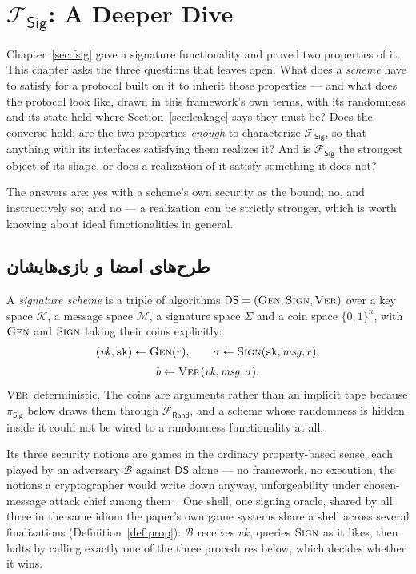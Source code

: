\documentclass[10pt,oneside,openany]{book}
\makeatletter
\newcommand{\nav@headtext}{}
\newcommand{\nav@setheadtext}[1]{%
  \gdef\nav@headtext{%
    \ifnum\c@secnumdepth>\m@ne
      \if@mainmatter \@chapapp\ \lr{\thechapter.}\ \fi
    \fi #1}}
\newcommand{\chapterhead}[1]{\nav@setheadtext{#1}}
\newcommand{\op}[1]{\textnormal{\textsc{#1}}}
\newcommand{\Frand}{\mathcal{F}_{\mathsf{Rand}}}
\newcommand{\Fsig}{\mathcal{F}_{\mathsf{Sig}}}
\newcommand{\DS}{\mathsf{DS}}
\newcommand{\psig}{\pi_{\mathsf{Sig}}}
\newcommand{\vk}{\mathit{vk}}
\newcommand{\msg}{\mathit{msg}}
\newcommand{\Keys}{\mathcal{K}}
\newcommand{\Msgs}{\mathcal{M}}
\newcommand{\Sigs}{\Sigma}
\newcommand{\V}[1]{\mathtt{#1}}
\theoremstyle{accentdef}
\theoremstyle{accentplain}
\makeatother
\begin{document}
\chapter{\texorpdfstring{$\Fsig$}{F\_Sig}: A Deeper Dive}\label{sec:sigdeep}
\chapterhead{F-Sig: A Deeper Dive}

Chapter~\ref{sec:fsig} gave a signature functionality and proved two properties of it. This
chapter asks the three questions that leaves open. What does a \emph{scheme} have to satisfy for
a protocol built on it to inherit those properties --- and what does the protocol look like, drawn
in this framework's own terms, with its randomness and its state held where
Section~\ref{sec:leakage} says they must be? Does the converse hold: are the two properties
\emph{enough} to characterize $\Fsig$, so that anything with its interfaces satisfying them
realizes it? And is $\Fsig$ the strongest object of its shape, or does a realization of it satisfy
something it does not?

The answers are: yes with a scheme's own security as the bound; no, and instructively so; and no
--- a realization can be strictly stronger, which is worth knowing about ideal functionalities in
general.

\section{طرح‌های امضا و بازی‌هایشان}\label{sec:dssyntax}

A \emph{signature scheme} is a triple of algorithms $\DS = (\op{Gen},\op{Sign},\op{Ver})$ over a
key space $\Keys$, a message space $\Msgs$, a signature space $\Sigs$ and a coin space
$\{0,1\}^{n}$, with $\op{Gen}$ and $\op{Sign}$ taking their coins explicitly:
\[
  \begin{gathered}
  (\vk, \V{sk}) \gets \op{Gen}(r) , \qquad
  \sigma \gets \op{Sign}(\V{sk}, \msg; r) , \\[3pt]
  b \gets \op{Ver}(\vk, \msg, \sigma) ,
  \end{gathered}
\]
$\op{Ver}$ deterministic. The coins are arguments rather than an implicit tape because $\psig$
below draws them through $\Frand$, and a scheme whose randomness is hidden inside it could not be
wired to a randomness functionality at all.

Its three security notions are games in the ordinary property-based sense, each played by an
adversary $\mathcal{B}$ against $\DS$ alone --- no framework, no execution, the notions a
cryptographer would write down anyway, unforgeability under chosen-message attack chief among
them~\cite{GMR88}. One shell, one signing oracle, shared by all three in the
same idiom the paper's own game systems share a shell across several finalizations
(Definition~\ref{def:prop}): $\mathcal{B}$ receives $\vk$, queries $\op{Sign}$ as it likes, then
halts by calling exactly one of the three procedures below, which decides whether it wins.
\end{document}
